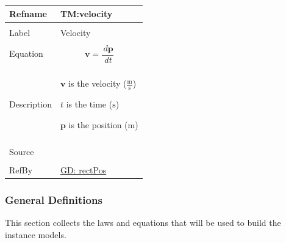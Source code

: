 \documentclass[12pt]{article}
\begin{document}
\begin{minipage}{\textwidth}
\begin{tabular}{>{\raggedright}p{}>{\raggedright\arraybackslash}p{}}
\toprule \textbf{Refname} & \textbf{TM:velocity}
\label{TM:velocity}
\\ \midrule \\
Label & Velocity
        
\\ \midrule \\
Equation & \begin{displaymath}
           \mathbf{v}=\frac{\,d\mathbf{p}}{\,dt}
           \end{displaymath}
\\ \midrule \\
Description & \begin{symbDescription}
              \item{$\mathbf{v}$ is the velocity ($\frac{\text{m}}{\text{s}}$)}
              \item{$t$ is the time (${\text{s}}$)}
              \item{$\mathbf{p}$ is the position (${\text{m}}$)}
              \end{symbDescription}
\\ \midrule \\
Source & \cite{velocityWiki}
         
\\ \midrule \\
RefBy & \hyperref[GD:rectPos]{GD: rectPos}
        
\\ \bottomrule
\end{tabular}
\end{minipage}
\subsubsection{General Definitions}
\label{Sec:GDs}
This section collects the laws and equations that will be used to build the instance models.
\end{document}
